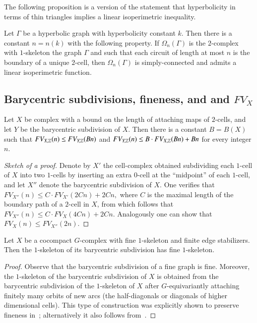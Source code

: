 The following proposition is a version of the statement that hyperbolicity in terms of thin triangles implies a linear isoperimetric inequality. 

\begin{proposition}\cite[Proposition 3.1]{Bo12} 
\label{lem:simply-connected-complex}
Let $\Gamma$ be a hyperbolic graph with hyperbolicity constant $k$. Then there is a constant $n=n(k)$ with the following property. If $\Omega_n(\Gamma)$ is the $2$-complex with $1$-skeleton the graph $\Gamma$ and such that each circuit of length at most $n$ is the boundary of a unique $2$-cell, then $\Omega_n(\Gamma)$ is simply-connected and admits a linear isoperimetric function. 
\end{proposition}


\subsection{Barycentric subdivisions, fineness, and and $FV_X$}

 
\begin{lemma}\label{lem:subdivision}
Let $X$ be complex with a bound on the length of attaching maps of $2$-cells, and let $Y$ be the barycentric subdivision of $X$.  Then there is a constant $B=B(X)$ such that
$FV_{X, \mathbb{Z}}(n) \leq FV_{Y, \mathbb{Z}}(Bn)$ and  $FV_{Y, \mathbb{Z}}(n)\leq  B\cdot FV_{X, \mathbb{Z}}(Bn) + Bn$
 for every integer $n$.
\end{lemma}
\begin{proof}[Sketch of a proof]
Denote by $X'$ the cell-complex obtained subdividing each $1$-cell of $X$ into two $1$-cells by inserting an extra $0$-cell at the ``midpoint'' of each $1$-cell, and let $X''$ denote the barycentric subdivision of $X$. One verifies that $FV_{X''}(n)\leq C \cdot FV_{X'}(2Cn)+ 2Cn,$
where $C$ is the maximal length of the boundary path of a $2$-cell in $X$, from which follows that 
$FV_{X''}(n) \leq C\cdot FV_{X}(4Cn)+2Cn.$ Analogously one can show that $FV_X(n)\leq FV_{X''}(2n).$ 
\end{proof}

\begin{lemma}\cite[Lemma 2.9]{MW11}\cite[Lemma 2.4]{Bo12} \label{lem:gsubdivision} 
Let $X$ be a cocompact $G$-complex with fine $1$-skeleton and finite edge stabilizers. Then the $1$-skeleton of its barycentric subdivision  has fine $1$-skeleton.
\end{lemma}
\begin{proof}
 Observe that the barycentric subdivision of a fine graph is fine. Moreover,  the $1$-skeleton of the barycentric subdivision of $X$ is obtained from the barycentric subdivision of the $1$-skeleton of $X$ after $G$-equivariantly attaching finitely many orbits of new arcs (the half-diagonals or diagonals of  higher dimensional cells). This type of construction  was explicitly shown to preserve fineness in~\cite[Lem. 2.9]{MW11}; alternatively it also follows from~\cite[Lem. 2.4]{Bo12}.  
\end{proof}



